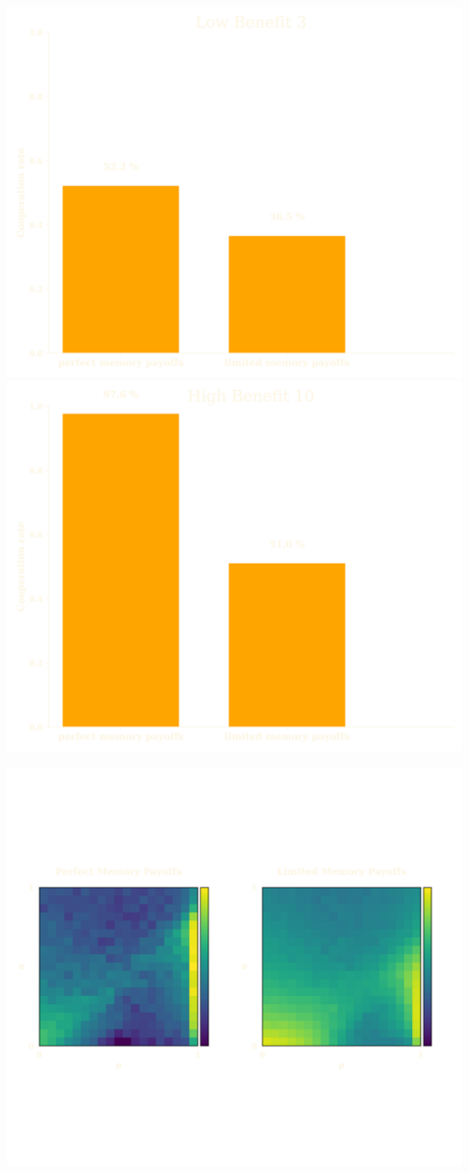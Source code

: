 \documentclass{beamer}
\begin{document}
\begin{frame}
    \centering
    \includegraphics[width=.45\textwidth]{static/cooperation_b_3.png}
    \pause
    \includegraphics[width=.45\textwidth]{static/cooperation_b_10.png}
\end{frame}


\begin{frame}
    \centering
    \includegraphics[width=.85\textwidth]{static/heatmap.png}
\end{frame}

\begin{frame}
    \centering
    
\end{frame}
\end{document}
